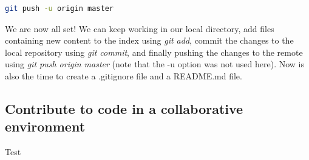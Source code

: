 \begin{lstlisting}[language=bash, caption=Push the local repository to the remote ]
git push -u origin master
\end{lstlisting}

We are now all set! We can keep working in our local directory, add files containing new content to the index using \textit{git add}, commit the changes to the local repository using \textit{git commit}, and finally pushing the changes to the remote using \textit{git push origin master} (note that the -u option was not used here). Now is also the time to create a .gitignore file and a README.md file.
\subsection{Contribute to code in a collaborative environment}

Test